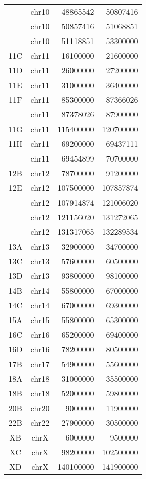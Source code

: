 \begin{center}
\begin{longtable}{@{\extracolsep{\fill}}ccrr}
         & chr10      & 48865542  & 50807416 \\
         & chr10      & 50857416  & 51068851 \\
         & chr10      & 51118851  & 53300000 \\
  11C    & chr11      & 16100000  & 21600000 \\
  11D    & chr11      & 26000000  & 27200000 \\
  11E    & chr11      & 31000000  & 36400000 \\
  11F    & chr11      & 85300000  & 87366026 \\
         & chr11      & 87378026  & 87900000 \\
  11G    & chr11      & 115400000 & 120700000 \\
  11H    & chr11      & 69200000  & 69437111 \\
         & chr11      & 69454899  & 70700000 \\
  12B    & chr12      & 78700000  & 91200000 \\
  12E    & chr12      & 107500000 & 107857874 \\
         & chr12      & 107914874 & 121006020 \\
         & chr12      & 121156020 & 131272065 \\
         & chr12      & 131317065 & 132289534 \\
  13A    & chr13      & 32900000  & 34700000 \\
  13C    & chr13      & 57600000  & 60500000 \\
  13D    & chr13      & 93800000  & 98100000 \\
  14B    & chr14      & 55800000  & 67000000 \\
  14C    & chr14      & 67000000  & 69300000 \\
  15A    & chr15      & 55800000  & 65300000 \\
  16C    & chr16      & 65200000  & 69400000 \\
  16D    & chr16      & 78200000  & 80500000 \\
  17B    & chr17      & 54900000  & 55600000 \\
  18A    & chr18      & 31000000  & 35500000 \\
  18B    & chr18      & 52000000  & 59800000 \\
  20B    & chr20      & 9000000   & 11900000 \\
  22B    & chr22      & 27900000  & 30500000 \\
  XB     & chrX       & 6000000   & 9500000 \\
  XC     & chrX       & 98200000  & 102500000 \\
  XD     & chrX       & 140100000 & 141900000 
\end{longtable}
\end{center}
